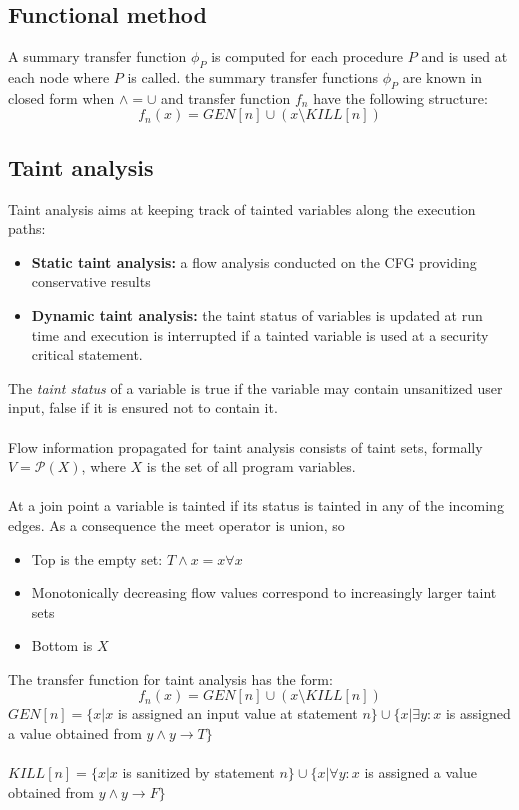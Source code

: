 \documentclass[10pt,a4paper]{article}
\begin{document}
\subsection{Functional method}
A summary transfer function $\phi_P$ is computed for each procedure $P$ and is used at each node where $P$ is called. the summary transfer functions $\phi_P$ are known in closed form when $\wedge = \cup$ and transfer function $f_n$ have the following structure:
$$ f_n(x) = GEN[n] \cup (x \setminus KILL[n])$$
\newpage
\subsection{Taint analysis}
Taint analysis aims at keeping track of tainted variables along the execution paths:
\begin{itemize}
\item {\bf Static taint analysis:} a flow analysis conducted on the CFG providing conservative results
\item {\bf Dynamic taint analysis:} the taint status of variables is updated at run time and execution is interrupted if a tainted variable is used at a security critical statement.
\end{itemize}
The \emph{taint status} of a variable is true if the variable may contain unsanitized user input, false if it is ensured not to contain it.\\\\
Flow  information propagated for taint analysis consists of taint sets, formally $V = \mathcal{P}(X)$, where $X$ is the set of all program variables.\\\\
At a join point a variable is tainted if its status is tainted in any of the incoming edges. As a consequence the meet operator is union, so
\begin{itemize}
\item Top is the empty set: $T \wedge x = x \forall x$
\item Monotonically decreasing flow values correspond to increasingly larger taint sets
\item Bottom is $X$
\end{itemize}
The transfer function for taint analysis has the form:
$$ f_n(x) = GEN[n] \cup (x \setminus KILL[n])$$
$GEN[n] = \{ x | x $ is assigned an input value at statement $n \} \cup \{ x | \exists y: x$ is assigned a value obtained from $y \wedge y \to T\}$\\\\
$KILL[n] = \{x|x$ is sanitized by statement $n \} \cup \{ x| \forall y: x $ is assigned a value obtained from $y \wedge y \to F \}$\\\\
\end{document}
